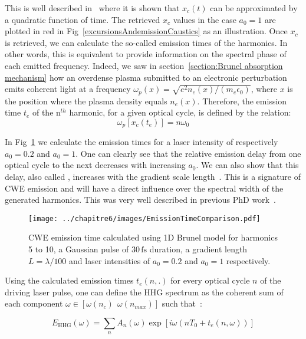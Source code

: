 \noindent This is well described in~\cite{thaury2010high} where it is shown that $x_c(t)$ can be approximated by a quadratic function of time.
The retrieved $x_c$ values in the case $a_0 = 1$ are plotted in red in Fig~\ref{excursionsAndemissionCaustics} as an illustration. 
Once $x_c$ is retrieved, we can calculate the so-called emission times of the harmonics. In other words, this is equivalent to provide information on the spectral phase of each emitted frequency. Indeed, we saw in section~\ref{section:Brunel absorption mechanism} how an overdense plasma submitted to an electronic perturbation emits coherent light at a frequency $\omega_p(x) = \sqrt{e^2 n_e(x)/(m_e \epsilon_0)}$, where $x$ is the position where the plasma density equals $n_e(x)$. Therefore, the emission time $t_e$ of the n$^{th}$ harmonic, for a given optical cycle, is defined by the relation:
$$
\omega_p[x_c(t_e)] = n \omega_0
$$

\noindent In Fig~\ref{fig:EmissionTimeComparison} we calculate the emission times for a laser intensity of respectively $a_0 = 0.2$ and $a_0 = 1$. One can clearly see that the relative emission delay from one optical cycle to the next decreases with increasing $a_0$. We can also show that this delay, also called , increases with the gradient scale length~\cite{TheseArnaud}.
This  is a signature of CWE emission and will have a direct influence over the spectral width of the generated harmonics. This was very well described in previous  PhD work~\cite{TheseArnaud,theseAnto,malvache2013coherent,TheseCedric}.


\begin{figure}[H]
\centering
\texttt{[image: ../chapitre6/images/EmissionTimeComparison.pdf]}\\
\caption{\label{fig:EmissionTimeComparison} CWE emission time calculated using 1D Brunel model for harmonics 5 to 10, a Gaussian pulse of $30\,\mathrm{fs}$ duration, a gradient length $L= \lambda / 100$ and laser intensities of $a_0 = 0.2$ and $a_0 =1$ respectively.}
\end{figure}

\noindent Using the calculated emission times $t_e(n,.)$ for every optical cycle $n$ of the driving laser pulse, one can define the HHG spectrum as the coherent sum of each component $\omega \in [\omega(n_c)\ \ \omega(n_{max})]$ such that~\cite{TheseArnaud}:

\begin{equation}
E_{\text{HHG}}(\omega) = \sum_{n}A_n(\omega)\exp[i\omega(nT_0+t_e(n,\omega))]
\end{equation}

